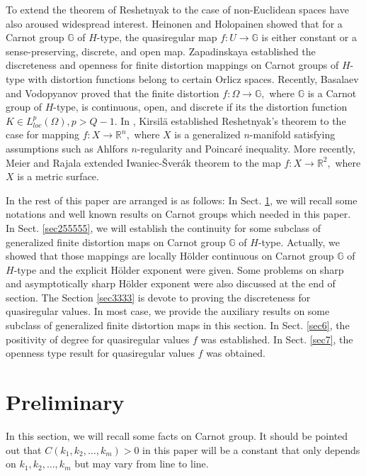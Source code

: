 \documentclass[11pt,twoside]{article}
\theoremstyle{definition}
\theoremstyle{remark}
\begin{document}
To extend the theorem of Reshetnyak \cite{Res89}  to the case of non-Euclidean spaces have also aroused  widespread interest.  Heinonen and  Holopainen \cite[Theorem 6.17]{HH97} showed that
for a Carnot group $\mathbb{G}$ of $H$-type, the quasiregular map $f:U\rightarrow\mathbb{G}$ is either constant or a sense-preserving, discrete, and open map.   Zapadinskaya \cite{Zap08} established the discreteness and openness for finite distortion mappings on Carnot groups of $H$-type  with distortion functions belong to certain Orlicz spaces.   Recently, Basalaev and  Vodopyanov \cite{BV23} proved that the finite distortion $f:\Omega\rightarrow \mathbb{G},$ where $ \mathbb{G}$ is a  Carnot group of $H$-type, is continuous, open, and discrete if its  the distortion function 
$K\in L_{loc}^{p}(\Omega), p>Q-1.$ In \cite{Kir16}, Kirsil\"{a}  established  Reshetnyak’s theorem to the case for mapping $f:X\rightarrow\mathbb{R}^{n},$ where $X$ is a generalized $n$-manifold satisfying assumptions such as Ahlfors $n$-regularity and Poincar\'{e} inequality. More recently, Meier and  Rajala \cite[Theorem 1.2]{MR25} extended Iwaniec-\v{S}ver\'{a}k theorem \cite{IS93} to the map $f: X\rightarrow\mathbb{R}^{2},$ where $X$ is a metric surface. 








In the rest of this paper are arranged is as follows: In Sect. \ref{sec2222}, we will recall some notations and well known results on Carnot groups which  needed in this paper.  In Sect. \ref{sec255555},
we will establish the continuity for some subclass of generalized finite distortion maps on Carnot group $\mathbb{G}$ of $H$-type.  Actually, we showed that those mappings are locally H\"{o}lder continuous on Carnot group $\mathbb{G}$ of $H$-type and the explicit H\"{o}lder exponent were given. Some problems on  sharp and asymptotically sharp H\"{o}lder exponent were also discussed at the end of section. The Section \ref{sec3333} is devote to proving the discreteness for quasiregular values. In most case, we provide the auxiliary results on some subclass of generalized finite distortion maps in this section.
 In Sect. \ref{sec6}, the positivity of degree for quasiregular values $f$  was established. In Sect. \ref{sec7},  the openness type result for quasiregular values $f$  was obtained.







\section{Preliminary}\label{sec2222}
In this section, we will recall some facts on Carnot group. It should be pointed out that  $C(k_{1},k_{2},\ldots,k_{m})>0$ in this paper will be a constant that only depends on $k_{1},k_{2},\ldots,k_{m}$ but may vary from line to line.
\end{document}
